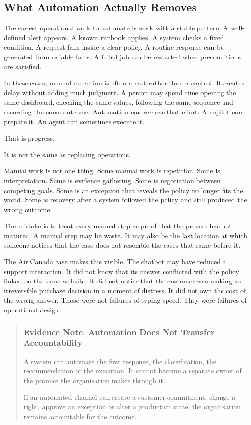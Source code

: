 \subsection{What Automation Actually
Removes}\label{what-automation-actually-removes}

The easiest operational work to automate is work with a stable pattern.
A well-defined alert appears. A known runbook applies. A system checks a
fixed condition. A request falls inside a clear policy. A routine
response can be generated from reliable facts. A failed job can be
restarted when preconditions are satisfied.

In these cases, manual execution is often a cost rather than a control.
It creates delay without adding much judgment. A person may spend time
opening the same dashboard, checking the same values, following the same
sequence and recording the same outcome. Automation can remove that
effort. A copilot can prepare it. An agent can sometimes execute it.

That is progress.

It is not the same as replacing operations.

Manual work is not one thing. Some manual work is repetition. Some is
interpretation. Some is evidence gathering. Some is negotiation between
competing goals. Some is an exception that reveals the policy no longer
fits the world. Some is recovery after a system followed the policy and
still produced the wrong outcome.

The mistake is to treat every manual step as proof that the process has
not matured. A manual step may be waste. It may also be the last
location at which someone notices that the case does not resemble the
cases that came before it.

The Air Canada case makes this visible. The chatbot may have reduced a
support interaction. It did not know that its answer conflicted with the
policy linked on the same website. It did not notice that the customer
was making an irreversible purchase decision in a moment of distress. It
did not own the cost of the wrong answer. Those were not failures of
typing speed. They were failures of operational design.

\begin{quote}
\subsubsection{Evidence Note: Automation Does Not Transfer
Accountability}\label{evidence-note-automation-does-not-transfer-accountability}

A system can automate the first response, the classification, the
recommendation or the execution. It cannot become a separate owner of
the promise the organisation makes through it.

If an automated channel can create a customer commitment, change a
right, approve an exception or alter a production state, the
organisation remains accountable for the outcome.
\end{quote}

